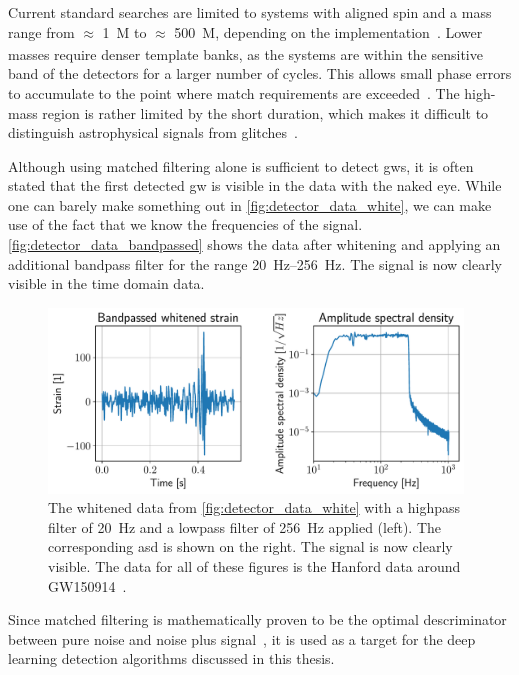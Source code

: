 Current standard searches are limited to systems with aligned spin and a mass range from $\approx$ \SI{1}{M_\odot} to $\approx$ \SI{500}{M_\odot}, depending on the implementation~\cite{LIGOScientific:2021djp, Nitz:2021uxj}. Lower masses require denser template banks, as the systems are within the sensitive band of the detectors for a larger number of cycles. This allows small phase errors to accumulate to the point where match requirements are exceeded~\cite{Harry:2009ea}. The high-mass region is rather limited by the short duration, which makes it difficult to distinguish astrophysical signals from glitches~\cite{Nitz:2017lco}.

Although using matched filtering alone is sufficient to detect \acrshort{gw}s, it is often stated that the first detected \acrshort{gw} is visible in the data with the naked eye. While one can barely make something out in \autoref{fig:detector_data_white}, we can make use of the fact that we know the frequencies of the signal. \autoref{fig:detector_data_bandpassed} shows the data after whitening and applying an additional bandpass filter for the range \SIrange{20}{256}{\hertz}. The signal is now clearly visible in the time domain data.

\begin{figure}
	\centering
	\includegraphics[width=0.98\textwidth]{chapters/foundations/sections/cbc_searches/images/data_bandpassed.pdf}
	\caption[Bandpassed and whitened detector data]{The whitened data from \autoref{fig:detector_data_white} with a highpass filter of \SI{20}{\hertz} and a lowpass filter of \SI{256}{\hertz} applied (left). The corresponding \acrshort{asd} is shown on the right. The signal is now clearly visible. The data for all of these figures is the Hanford data around GW150914~\cite{LIGOScientific:2016aoc}.}\label{fig:detector_data_bandpassed}
\end{figure}

Since matched filtering is mathematically proven to be the optimal descriminator between pure noise and noise plus signal~\cite{Allen:2005fk}, it is used as a target for the deep learning detection algorithms discussed in this thesis.

